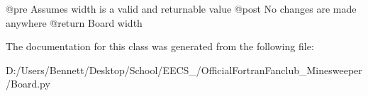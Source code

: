 \begin{DoxyVerb}@pre    Assumes width is a valid and returnable value
    @post   No changes are made anywhere
    @return Board width
\end{DoxyVerb}
 

The documentation for this class was generated from the following file\+:\begin{DoxyCompactItemize}
\item 
D\+:/\+Users/\+Bennett/\+Desktop/\+School/\+E\+E\+C\+S\+\_/\+Official\+Fortran\+Fanclub\+\_\+\+Minesweeper/Board.\+py\end{DoxyCompactItemize}
